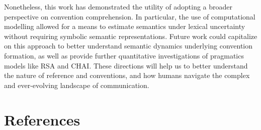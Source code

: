 \documentclass[10pt, letterpaper]{article}
\begin{document}
Nonetheless, this work has demonstrated the utility of adopting a
broader perspective on convention comprehension. In particular, the use
of computational modelling allowed for a means to estimate semantics
under lexical uncertainty without requiring symbolic semantic
representations. Future work could capitalize on this approach to better
understand semantic dynamics underlying convention formation, as well as
provide further quantitative investigations of pragmatics models like
RSA and CHAI. These directions will help us to better understand the
nature of reference and conventions, and how humans navigate the complex
and ever-evolving landscape of communication.

\section{References}\label{references}

\setlength{\parindent}{-0.1in} 
\setlength{\leftskip}{0.125in}

\noindent
\end{document}

